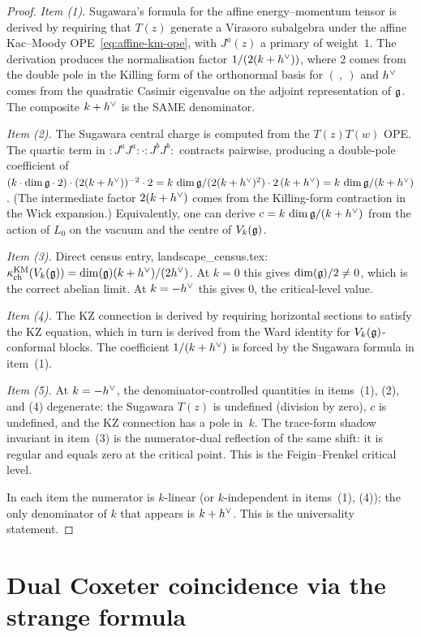 \begin{proof}
\emph{Item (1).} Sugawara's formula for the affine energy--momentum
tensor is derived by requiring that $T(z)$ generate a Virasoro
subalgebra under the affine Kac--Moody OPE~\eqref{eq:affine-km-ope},
with $J^a(z)$ a primary of weight~$1$. The derivation produces the
normalisation factor $1/(2(k + h^{\vee}))$, where $2$ comes from the double
pole in the Killing form of the orthonormal basis for $(\ ,\ )$ and
$h^{\vee}$ comes from the quadratic Casimir eigenvalue on the adjoint
representation of $\mathfrak{g}$. The composite $k + h^{\vee}$ is the SAME
denominator.

\emph{Item (2).} The Sugawara central charge is computed from the
$T(z) T(w)$ OPE. The quartic term in
$:\!J^a J^a\!:\cdot:\!J^b J^b\!:$ contracts pairwise, producing a
double-pole coefficient of $(k \cdot \dim\mathfrak{g} \cdot 2) \cdot
(2(k + h^{\vee}))^{-2} \cdot 2 = k\,\dim\mathfrak{g} / (2(k + h^{\vee})^2) \cdot 2\,(k+h^{\vee}) = k\,\dim\mathfrak{g} / (k + h^{\vee})$.
(The intermediate factor $2(k + h^{\vee})$ comes from the Killing-form
contraction in the Wick expansion.) Equivalently, one can derive
$c = k\,\dim\mathfrak{g} / (k + h^{\vee})$ from the action of $L_0$ on the vacuum
and the centre of $V_k(\mathfrak{g})$.

\emph{Item (3).} Direct census entry, landscape\_census.tex:
$\kappa_{\mathrm{ch}}^{\mathrm{KM}}(V_k(\mathfrak{g})) = \dim(\mathfrak{g})(k + h^{\vee})/(2h^{\vee})$. At $k = 0$
this gives $\dim(\mathfrak{g})/2 \neq 0$, which is the correct abelian limit.
At $k = -h^{\vee}$ this gives $0$, the critical-level
value.

\emph{Item (4).} The KZ connection is derived by requiring horizontal
sections to satisfy the KZ equation, which in turn is derived from
the Ward identity for $V_k(\mathfrak{g})$-conformal blocks. The coefficient
$1/(k + h^{\vee})$ is forced by the Sugawara formula in item~(1).

\emph{Item (5).} At $k = -h^{\vee}$, the denominator-controlled
quantities in items~(1), (2), and (4) degenerate: the Sugawara
$T(z)$ is undefined (division by zero), $c$ is undefined, and the
KZ connection has a pole in~$k$. The trace-form shadow invariant in
item~(3) is the numerator-dual reflection of the same shift: it is
regular and equals zero at the critical point. This is the
Feigin--Frenkel critical level.

In each item the numerator is $k$-linear (or $k$-independent in
items~(1), (4)); the only denominator of $k$ that appears is
$k + h^{\vee}$. This is the universality statement.
\end{proof}

\section{Dual Coxeter coincidence via the strange formula}
\label{sec:strange-formula}

